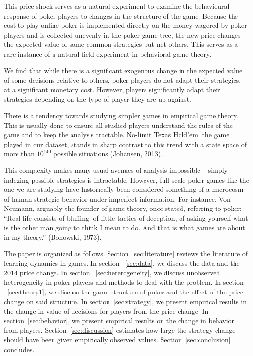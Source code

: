 \documentclass[12pt]{article}
\begin{document}
This price shock serves as a natural experiment to examine the behavioural response of poker players to changes in the structure of the game. Because the cost to play online poker is implemented directly on the money wagered by poker players and is collected unevenly in the poker game tree, the new price changes the expected value of some common strategies but not others. This serves as a rare instance of a natural field experiment in behavioral game theory.

We find that while there is a significant exogenous change in the expected value of some decisions relative to others, poker players do not adapt their strategies, at a significant monetary cost. However, players significantly adapt their strategies depending on the type of player they are up against.

There is a tendency towards studying simpler games in empirical game theory. This is usually done to ensure all studied players understand the rules of the game and to keep the analysis tractable. No-limit Texas Hold’em, the game played in our dataset, stands in sharp contrast to this trend with a state space of more than $10^{140}$ possible situations (Johansen, 2013). 

This complexity makes many usual avenues of analysis impossible – simply indexing possible strategies is intractable. However, full scale poker games like the one we are studying have historically been considered something of a microcosm of human strategic behavior under imperfect information. For instance, Von Neumann, arguably the founder of game theory, once stated, referring to poker: “Real life consists of bluffing, of little tactics of deception, of asking yourself what is the other man going to think I mean to do.  And that is what games are about in my theory.” (Bonowski, 1973).

The paper is organized as follows. Section~\ref{sec:literature} reviews the literature of learning dynamics in games. In section ~\ref{sec:data}, we discuss the data and the 2014 price change. In section ~\ref{sec:heterogeneity}, we discuss unobserved heterogeneity in poker players and methods to deal with the problem. In section ~\ref{sec:theory1}, we discuss the game structure of poker and the effect of the price change on said structure. In section~\ref{sec:strategy}, we present empirical results in the change in value of decisions for players from the price change. In section~\ref{sec:behavior}, we present empirical results on the change in behavior from players. Section~\ref{sec:discussion} estimates how large the strategy change should have been given empirically observed values. Section~\ref{sec:conclusion} concludes.
\end{document}
